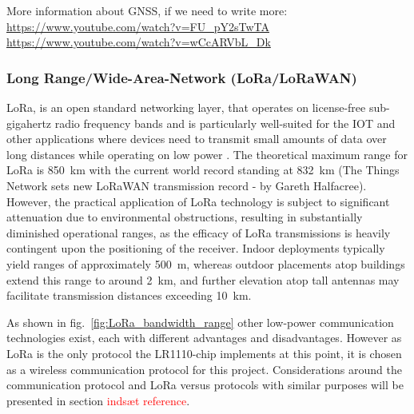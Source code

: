 More information about \ac{GNSS}, if we need to write more:
\url{https://www.youtube.com/watch?v=FU_pY2sTwTA}
\url{https://www.youtube.com/watch?v=wCcARVbL_Dk}


\subsubsection{Long Range/Wide-Area-Network (LoRa/LoRaWAN)}
\ac{LoRa}, is an open standard networking layer, that operates on license-free sub-gigahertz radio frequency bands and is particularly well-suited for the \ac{IOT} and other applications where devices need to transmit small amounts of data over long distances while operating on low power \cite{LoRaWAN_1_0}.
The theoretical maximum range for \ac{LoRa} is \SI{850}{\kilo\meter} with the current world record standing at \SI{832}{\kilo\meter} (The Things Network sets new \ac{LoRaWAN} transmission record - by Gareth Halfacree).
However, the practical application of \ac{LoRa} technology is subject to significant attenuation due to environmental obstructions, resulting in substantially diminished operational ranges, as the efficacy of \ac{LoRa} transmissions is heavily contingent upon the positioning of the receiver. Indoor deployments typically yield ranges of approximately \SI{500}{\meter}, whereas outdoor placements atop buildings extend this range to around \SI{2}{\kilo\meter}, and further elevation atop tall antennas may facilitate transmission distances exceeding \SI{10}{\kilo\meter}.

As shown in fig.~\ref{fig:LoRa_bandwidth_range} other low-power communication technologies exist, each with different advantages and disadvantages. However as \ac{LoRa} is the only protocol the LR1110-chip implements at this point, it is chosen as a wireless communication protocol for this project.
Considerations around the communication protocol and \ac{LoRa} versus protocols with similar purposes will be presented in section \textcolor{red}{indsæt reference}.

